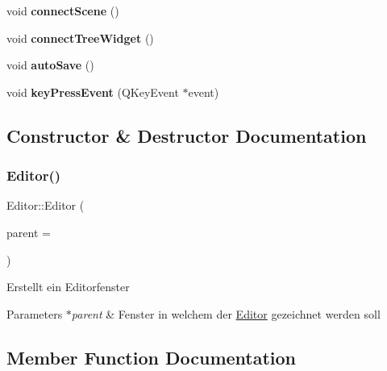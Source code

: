 \begin{DoxyCompactItemize}
\item 
\mbox{\label{class_editor_a13cac52c413b63b00ff2fe780f65ba69}} 
void {\bfseries connect\+Scene} ()
\item 
\mbox{\label{class_editor_ae60e42139a89b158340861caeded5ac0}} 
void {\bfseries connect\+Tree\+Widget} ()
\item 
\mbox{\label{class_editor_a27e06cb4821cac63581425db3e556195}} 
void {\bfseries auto\+Save} ()
\item 
\mbox{\label{class_editor_a5adfadc8dff014c5462cd71e0a2c6259}} 
void {\bfseries key\+Press\+Event} (Q\+Key\+Event $\ast$event)
\end{DoxyCompactItemize}


\subsection{Constructor \& Destructor Documentation}
\mbox{\label{class_editor_a2918aceeffbc123a96e201b0934b9b16}} 
\subsubsection{\texorpdfstring{Editor()}{Editor()}}
{\footnotesize\ttfamily Editor\+::\+Editor (\begin{DoxyParamCaption}\item[{Q\+Widget $\ast$}]{parent = {} }\end{DoxyParamCaption})\hspace{0.3cm}{\ttfamily [explicit]}}

Erstellt ein Editorfenster 
\begin{DoxyParams}{Parameters}
{\em $\ast$parent} & Fenster in welchem der \mbox{\hyperlink{class_editor}{Editor}} gezeichnet werden soll \\
\hline
\end{DoxyParams}


\subsection{Member Function Documentation}
\mbox{\label{class_editor_a7c91cc0098ff48ec885422b6c49d27e0}} 
